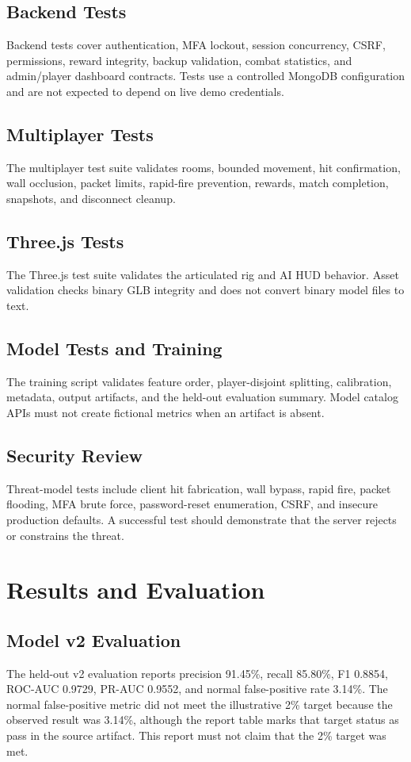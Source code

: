 \documentclass[12pt,a4paper,oneside]{report}
\begin{document}
\section{Backend Tests}
Backend tests cover authentication, MFA lockout, session concurrency, CSRF, permissions, reward integrity, backup validation, combat statistics, and admin/player dashboard contracts. Tests use a controlled MongoDB configuration and are not expected to depend on live demo credentials.

\section{Multiplayer Tests}
The multiplayer test suite validates rooms, bounded movement, hit confirmation, wall occlusion, packet limits, rapid-fire prevention, rewards, match completion, snapshots, and disconnect cleanup.

\section{Three.js Tests}
The Three.js test suite validates the articulated rig and AI HUD behavior. Asset validation checks binary GLB integrity and does not convert binary model files to text.

\section{Model Tests and Training}
The training script validates feature order, player-disjoint splitting, calibration, metadata, output artifacts, and the held-out evaluation summary. Model catalog APIs must not create fictional metrics when an artifact is absent.

\section{Security Review}
Threat-model tests include client hit fabrication, wall bypass, rapid fire, packet flooding, MFA brute force, password-reset enumeration, CSRF, and insecure production defaults. A successful test should demonstrate that the server rejects or constrains the threat.

\chapter{Results and Evaluation}
\section{Model v2 Evaluation}
The held-out v2 evaluation reports precision 91.45\%, recall 85.80\%, F1 0.8854, ROC-AUC 0.9729, PR-AUC 0.9552, and normal false-positive rate 3.14\%. The normal false-positive metric did not meet the illustrative 2\% target because the observed result was 3.14\%, although the report table marks that target status as pass in the source artifact. This report must not claim that the 2\% target was met.
\end{document}
